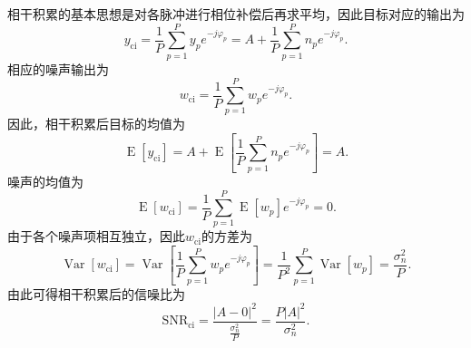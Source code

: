 相干积累的基本思想是对各脉冲进行相位补偿后再求平均，因此目标对应的输出为
\[
    y_{\mathrm{ci}} = \frac{1}{P} \sum_{p=1}^P y_p e^{-j \varphi_p} = A + \frac{1}{P} \sum_{p=1}^P n_p e^{-j \varphi_p}.
\]
相应的噪声输出为
\[
    w_{\mathrm{ci}} = \frac{1}{P} \sum_{p=1}^P w_p e^{-j \varphi_p}.
\]
因此，相干积累后目标的均值为
\[
    \operatorname{E}[y_{\mathrm{ci}}] = A + \operatorname{E}\left[ \frac{1}{P} \sum_{p=1}^P n_p e^{-j \varphi_p} \right] = A.
\]
噪声的均值为
\[
    \operatorname{E}[w_{\mathrm{ci}}] = \frac{1}{P} \sum_{p=1}^P \operatorname{E}[w_p] e^{-j \varphi_p} = 0.
\]
由于各个噪声项相互独立，因此\(w_{\mathrm{ci}}\)的方差为
\[
    \operatorname{Var}[w_{\mathrm{ci}}] =\operatorname{Var}\left[\frac{1}{P}\sum_{p=1}^P w_p e^{-j \varphi_p} \right] = \frac{1}{P^2}\sum_{p=1}^P \operatorname{Var}[w_p] = \frac{\sigma^2_n}{P}.
\]
由此可得相干积累后的信噪比为
\[
    \mathrm{SNR}_{\mathrm{ci}} = \frac{|A - 0|^2}{\frac{\sigma^2_n}{P}} = \frac{P|A|^2}{\sigma^2_n}.
\]

